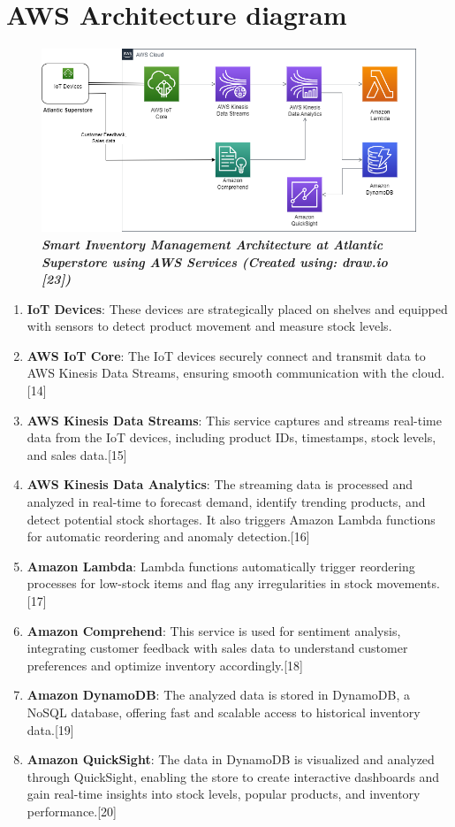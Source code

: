 \section{AWS Architecture diagram}
\begin{figure}[htp]
    \centering
    \includegraphics[width=17cm]{PROBLEM 1/Diagram.drawio.png}
    \caption{\textbf{\textit{Smart Inventory Management Architecture at Atlantic Superstore using AWS Services (Created using: draw.io [23])}}}
    \label{fig:aws-arch-diag}
\end{figure}
\begin{enumerate}
    \item \textbf{IoT Devices}: These devices are strategically placed on shelves and equipped with sensors to detect product movement and measure stock levels.
    \item \textbf{AWS IoT Core}: The IoT devices securely connect and transmit data to AWS Kinesis Data Streams, ensuring smooth communication with the cloud.[14]
    \item \textbf{AWS Kinesis Data Streams}: This service captures and streams real-time data from the IoT devices, including product IDs, timestamps, stock levels, and sales data.[15]
    \item \textbf{AWS Kinesis Data Analytics}: The streaming data is processed and analyzed in real-time to forecast demand, identify trending products, and detect potential stock shortages. It also triggers Amazon Lambda functions for automatic reordering and anomaly detection.[16]
    \item \textbf{Amazon Lambda}: Lambda functions automatically trigger reordering processes for low-stock items and flag any irregularities in stock movements.[17]
    \item \textbf{Amazon Comprehend}: This service is used for sentiment analysis, integrating customer feedback with sales data to understand customer preferences and optimize inventory accordingly.[18]
    \item \textbf{Amazon DynamoDB}: The analyzed data is stored in DynamoDB, a NoSQL database, offering fast and scalable access to historical inventory data.[19]
    \item \textbf{Amazon QuickSight}: The data in DynamoDB is visualized and analyzed through QuickSight, enabling the store to create interactive dashboards and gain real-time insights into stock levels, popular products, and inventory performance.[20]
\end{enumerate}



